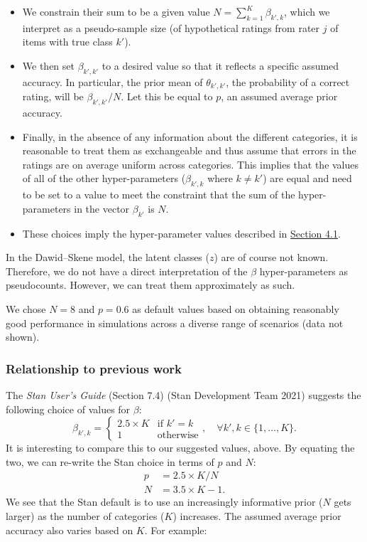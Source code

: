 \begin{itemize}
\item
  We constrain their sum to be a given value
  \(N = \sum_{k = 1}^K \beta_{k',  k}\), which we interpret as a pseudo-sample size (of hypothetical
  ratings from rater \(j\) of items with true class \(k'\)).
\item
  We then set \(\beta_{k', k'}\) to a desired value so that it reflects
  a specific assumed accuracy. In particular, the prior mean of
  \(\theta_{k',  k'}\), the probability of a correct rating, will be
  \(\beta_{k', k'} / N\). Let this be equal to \(p\), an assumed average
  prior accuracy.
\item
  Finally, in the absence of any information about the different
  categories, it is reasonable to treat them as exchangeable and thus
  assume that errors in the ratings are on average uniform across
  categories. This implies that the values of all of the other
  hyper-parameters (\(\beta_{k',  k}\) where \(k \neq k'\)) are equal and need to be set to a value
  to meet the constraint that the sum of the hyper-parameters in the
  vector \(\beta_{k'}\) is \(N\).
\item
  These choices imply the hyper-parameter values described in
  \protect\hyperlink{sec:dawid-skene}{Section 4.1}.
\end{itemize}

In the Dawid--Skene model, the latent classes (\(z\)) are of course not
known. Therefore, we do not have a direct interpretation of the \(\beta\)
hyper-parameters as pseudocounts. However, we can treat them
approximately as such.

We chose \(N = 8\) and \(p = 0.6\) as default values based on obtaining
reasonably good performance in simulations across a diverse range of
scenarios (data not shown).

\hypertarget{relationship-to-previous-work}{%
\subsubsection{Relationship to previous work}\label{relationship-to-previous-work}}

The \emph{Stan User's Guide} (Section 7.4) (Stan Development Team 2021) suggests the following choice of
values for \(\beta\):
\[
  \beta_{k', k} =
    \begin{cases}
      2.5 \times K & \textrm{if } k' = k \\
      1 & \textrm{otherwise}
    \end{cases},
  \quad \forall k', k \in \{1, \dots, K\}.
\]
It is interesting to compare this to our suggested values, above. By
equating the two, we can re-write the Stan choice in terms of \(p\) and
\(N\):
\[
\begin{aligned}
  p &= 2.5 \times K / N  \\
  N &= 3.5 \times K - 1.
\end{aligned}
\]
We see that the Stan default is to use an increasingly informative prior
(\(N\) gets larger) as the number of categories (\(K\)) increases. The
assumed average prior accuracy also varies based on \(K\). For example:

